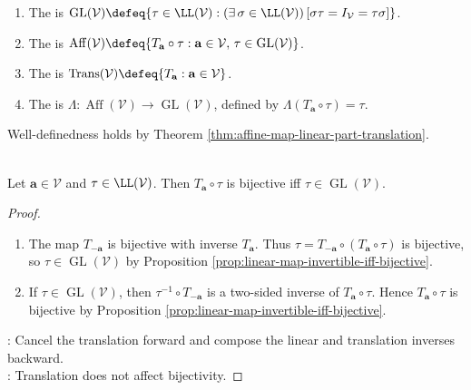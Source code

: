 \begin{definition} \label{def:affine-group-translations-linear-part} 
\begin{enumerate}[label=(\roman*)]
\setlength{\itemsep}{0pt}
\item The  is $\operatorname{GL}(\mathcal{V})\defeq\{\tau\in\LL(\mathcal{V}):(\exists\,\sigma\in\LL(\mathcal{V}))\,[\sigma\tau=I_{\mathcal{V}}=\tau\sigma]\}$.
\item The  is $\operatorname{Aff}(\mathcal{V})\defeq\{T_{\mathbf{a}}\circ\tau:\mathbf{a}\in\mathcal{V},\,\tau\in\operatorname{GL}(\mathcal{V})\}$.
\item The  is $\operatorname{Trans}(\mathcal{V})\defeq\{T_{\mathbf{a}}:\mathbf{a}\in\mathcal{V}\}$.
\item The  is $\Lambda:\operatorname{Aff}(\mathcal{V})\to\operatorname{GL}(\mathcal{V})$, defined by $\Lambda(T_{\mathbf{a}}\circ\tau)=\tau$.
\end{enumerate}
Well-definedness holds by Theorem \ref{thm:affine-map-linear-part-translation}.
\end{definition}

\begin{corollary} \label{cor:affine-map-bijective-linear-part} \\
Let $\mathbf{a}\in\mathcal{V}$ and $\tau\in\LL(\mathcal{V})$. Then $T_{\mathbf{a}}\circ\tau$ is bijective iff $\tau\in\operatorname{GL}(\mathcal{V})$.
\begin{proof}
\begin{enumerate}[label=\roman*.]
\setlength{\itemsep}{0pt}
\item[$(\Rightarrow)$] The map $T_{-\mathbf{a}}$ is bijective with inverse $T_{\mathbf{a}}$. Thus $\tau=T_{-\mathbf{a}}\circ(T_{\mathbf{a}}\circ\tau)$ is bijective, so $\tau\in\operatorname{GL}(\mathcal{V})$ by Proposition \ref{prop:linear-map-invertible-iff-bijective}.
\item[$(\Leftarrow)$] If $\tau\in\operatorname{GL}(\mathcal{V})$, then $\tau^{-1}\circ T_{-\mathbf{a}}$ is a two-sided inverse of $T_{\mathbf{a}}\circ\tau$. Hence $T_{\mathbf{a}}\circ\tau$ is bijective by Proposition \ref{prop:linear-map-invertible-iff-bijective}.
\end{enumerate}
: Cancel the translation forward and compose the linear and translation inverses backward.\\
: Translation does not affect bijectivity.
\end{proof}
\end{corollary}

